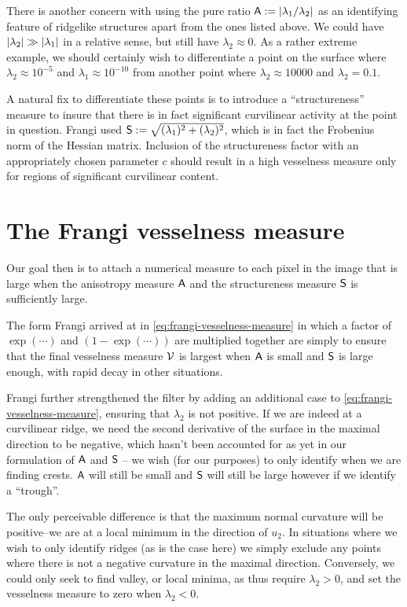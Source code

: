 There is another concern with using the pure ratio $\Am:= \abs{\lambda_1 / \lambda_2}$ as an identifying feature of ridgelike structures apart from the ones listed above. We could have $\abs*{\lambda_2} \gg \abs*{\lambda_1}$ in a relative sense, but still have $\lambda_2 \approx 0$. As a rather extreme example, we should certainly wish to differentiate a point on the surface where $\lambda_2 \approx 10^{-5} $ and $\lambda_1 \approx 10^{-10}$ from another point where $\lambda_2 \approx 10000$ and $\lambda_2 = 0.1$.

A natural fix to differentiate these points is to introduce a ``structureness'' measure to insure that there is in fact significant curvilinear activity at the point in question. Frangi used $\Sm:= \sqrt{(\lambda_1)^2 + (\lambda_2)^2}$, which is in fact the Frobenius norm of the Hessian matrix. Inclusion of the structureness factor with an appropriately chosen parameter $c$ should result in a high vesselness measure only for regions of significant curvilinear content.


\section{The Frangi vesselness measure}

Our goal then is to attach a numerical measure to each pixel in the image %
that is large when the anisotropy measure $\Am$ and the structureness measure $\Sm$ is sufficiently large.

The form Frangi arrived at in \cref{eq:frangi-vesselness-measure} in which a factor of $\exp(\cdots)$ and $(1 - \exp(\cdots))$ are multiplied together are simply to ensure that the final vesselness measure $\V$ is largest when $\Am$ is small and $\Sm$ is large enough, with rapid decay in other situations.

Frangi further strengthened the filter by adding an additional case to \cref{eq:frangi-vesselness-measure}, ensuring that $\lambda_2$ is not positive. If we are indeed at a curvilinear ridge, we need the second derivative of the surface in the maximal direction to be negative, which hasn't been accounted for as yet in our formulation of $\Am$ and $\Sm$ -- we wish (for our purposes) to only identify when we are finding crests. $\Am$ will still be small and $\Sm$ will still be large however if we identify a ``trough''.

The only perceivable difference is that the maximum normal curvature will be positive--we are at a local minimum in the direction of $u_2$. In situations where we wish to only identify ridges (as is the case here) we simply exclude any points where there is not a negative curvature in the maximal direction. Conversely, we could only seek to find valley, or local minima, as thus require $\lambda_2 > 0$, and set the vesselness measure to zero when $\lambda_2 < 0$.



